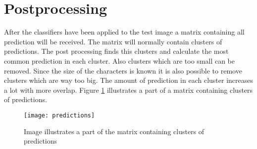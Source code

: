 \section{Postprocessing}
\label{sec:Postprocessing}
After the classifiers have been applied to the test image a matrix containing all prediction will be received. The matrix will normally contain clusters of predictions. The post processing finds this clusters and calculate the most common prediction in each cluster. Also clusters which are too small can be removed. Since the size of the characters is known it is also possible to remove clusters which are way too big. The amount of prediction in each cluster increases a lot with more overlap. Figure \ref{predictions} illustrates a part of a matrix containing clusters of predictions. 



\begin{figure}[H]
\centering
	\texttt{[image: predictions]}
	\caption{Image illustrates a part of the matrix containing clusters of predictions}
	\label{predictions}
\end{figure}
